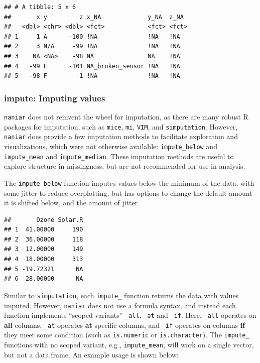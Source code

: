 \documentclass[]{article}
\newenvironment{Shaded}{\begin{snugshade}}{\end{snugshade}}
\newcommand{\DataTypeTok}[1]{\textcolor[rgb]{0.13,0.29,0.53}{#1}}
\newcommand{\DecValTok}[1]{\textcolor[rgb]{0.00,0.00,0.81}{#1}}
\newcommand{\KeywordTok}[1]{\textcolor[rgb]{0.13,0.29,0.53}{\textbf{#1}}}
\newcommand{\NormalTok}[1]{#1}
\newcommand{\OperatorTok}[1]{\textcolor[rgb]{0.81,0.36,0.00}{\textbf{#1}}}
\newcommand{\StringTok}[1]{\textcolor[rgb]{0.31,0.60,0.02}{#1}}
\theoremstyle{definition}
\theoremstyle{definition}
\theoremstyle{definition}
\theoremstyle{remark}
\begin{document}
\begin{Shaded}
\end{Shaded}

\begin{verbatim}
## # A tibble: 5 x 6
##       x y         z x_NA             y_NA  z_NA 
##   <dbl> <chr> <dbl> <fct>            <fct> <fct>
## 1     1 A      -100 !NA              !NA   !NA  
## 2     3 N/A     -99 !NA              !NA   !NA  
## 3    NA <NA>    -98 NA               NA    !NA  
## 4   -99 E      -101 NA_broken_sensor !NA   !NA  
## 5   -98 F        -1 !NA              !NA   !NA
\end{verbatim}

\hypertarget{verbs-impute}{%
\subsubsection{impute: Imputing values}\label{verbs-impute}}

\texttt{naniar} does not reinvent the wheel for imputation, as there are
many robust R packages for imputation, such as \texttt{mice},
\texttt{mi}, \texttt{VIM}, and \texttt{simputation}. However,
\texttt{naniar} does provide a few imputation methods to facilitate
exploration and visualizations, which were not otherwise available:
\texttt{impute\_below} and \texttt{impute\_mean} and
\texttt{impute\_median}. These imputation methods are useful to explore
structure in missingness, but are not recommended for use in analysis.

The \texttt{impute\_below} function imputes values below the minimum of
the data, with some jitter to reduce overplotting, but has options to
change the default amount it is shifted below, and the amount of jitter.

\begin{verbatim}
##       Ozone Solar.R
## 1  41.00000     190
## 2  36.00000     118
## 3  12.00000     149
## 4  18.00000     313
## 5 -19.72321      NA
## 6  28.00000      NA
\end{verbatim}

Similar to \texttt{simputation}, each \texttt{impute\_} function returns
the data with values imputed. However, \texttt{naniar} does not use a
formula syntax, and instead each function implements ``scoped variants''
\texttt{\_all}, \texttt{\_at} and \texttt{\_if}. Here, \texttt{\_all}
operates on \textbf{all} columns, \texttt{\_at} operates \textbf{at}
specific columns, and \texttt{\_if} operates on columns \textbf{if} they
meet some condition (such as \texttt{is.numeric} or
\texttt{is.character}). The \texttt{impute\_} functions with no scoped
variant, e.g., \texttt{impute\_mean}, will work on a single vector, but
not a data.frame. An example usage is shown below:
\end{document}
